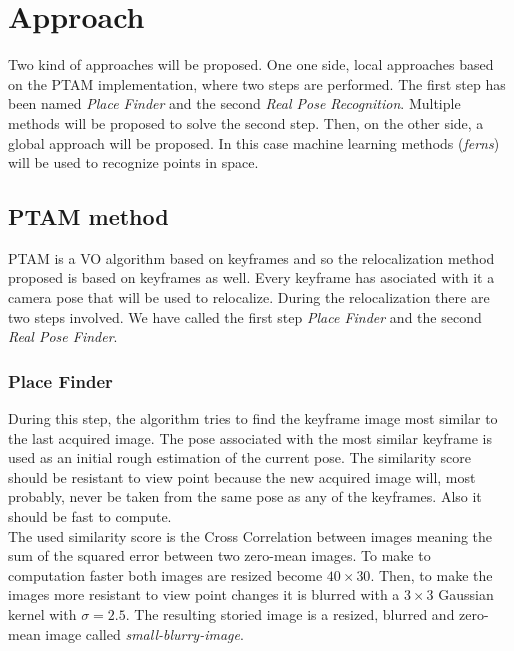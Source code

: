 \chapter{Approach}\label{sec:approach}

Two kind of approaches will be proposed. One one side, local approaches based on the PTAM implementation, where two steps are performed. The first step has been named \textit{Place Finder} and the second \textit{Real Pose Recognition}. Multiple methods will be proposed to solve the second step. Then, on the other side, a global approach will be proposed. In this case machine learning methods (\textit{ferns}) will be used to recognize points in space.

\section{PTAM method}
\label{sec:ptam_method}

PTAM is a VO algorithm based on keyframes and so the relocalization method proposed is based on keyframes as well. Every keyframe has asociated with it a camera pose that will be used to relocalize. During the relocalization there are two steps involved. We have called the first step \textit{Place Finder} and the second \textit{Real Pose Finder}.

\subsection{Place Finder}
\label{ssub:place_recognition}

During this step, the algorithm tries to find the keyframe image most similar to the last acquired image. The pose associated with the most similar keyframe is used as an initial rough estimation of the current pose. The similarity score should be resistant to view point because the new acquired image will, most probably, never be taken from the same pose as any of the keyframes. Also it should be fast to compute.\\

The used similarity score is the Cross Correlation between images meaning the sum of the squared error between two zero-mean images. To make to computation faster both images are resized become $40\times30$. Then, to make the images more resistant to view point changes it is blurred with a $3\times3$ Gaussian kernel with $\sigma=2.5$. The resulting storied image is a resized, blurred and zero-mean image called \textit{small-blurry-image}.\\

